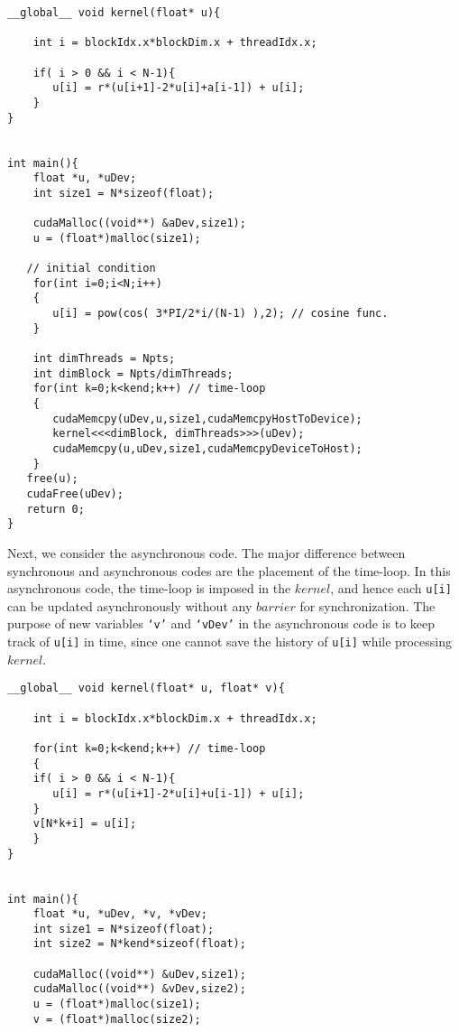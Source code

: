 \documentclass[1p]{elsarticle}
\begin{document}
\begin{itemize}
{\color[rgb]{0.54, 0.2, 0.14}{\item \bf Synchronous Algorithm}}
\begin{lstlisting}
__global__ void kernel(float* u){

    int i = blockIdx.x*blockDim.x + threadIdx.x;
  
	if( i > 0 && i < N-1){
	   u[i] = r*(u[i+1]-2*u[i]+a[i-1]) + u[i];
	}
}


int main(){
    float *u, *uDev;
    int size1 = N*sizeof(float);

    cudaMalloc((void**) &aDev,size1);
    u = (float*)malloc(size1);

   // initial condition
    for(int i=0;i<N;i++)
    {
	   u[i] = pow(cos( 3*PI/2*i/(N-1) ),2); // cosine func.
    }

    int dimThreads = Npts;
    int dimBlock = Npts/dimThreads;
    for(int k=0;k<kend;k++) // time-loop
    {
	   cudaMemcpy(uDev,u,size1,cudaMemcpyHostToDevice);
	   kernel<<<dimBlock, dimThreads>>>(uDev);
	   cudaMemcpy(u,uDev,size1,cudaMemcpyDeviceToHost);
    }
   free(u);
   cudaFree(uDev);
   return 0;
}
\end{lstlisting}

Next, we consider the asynchronous code. The major difference between synchronous and asynchronous codes are the placement of the time-loop. In this asynchronous code, the time-loop is imposed in the $kernel$, and hence each \texttt{u[i]} can be updated asynchronously without any  $barrier$ for synchronization. The purpose of new variables \texttt{`v'} and \texttt{`vDev'} in the asynchronous code is to keep track of \texttt{u[i]} in time, since one cannot save the history of \texttt{u[i]} while processing $kernel$.




{\color[rgb]{0.54, 0.2, 0.14}{\item \bf Asynchronous Algorithm}}
\begin{lstlisting}
__global__ void kernel(float* u, float* v){

    int i = blockIdx.x*blockDim.x + threadIdx.x;
  
    for(int k=0;k<kend;k++) // time-loop
    {
	if( i > 0 && i < N-1){
	   u[i] = r*(u[i+1]-2*u[i]+u[i-1]) + u[i];
	}
	v[N*k+i] = u[i];
    }
}


int main(){
    float *u, *uDev, *v, *vDev;
    int size1 = N*sizeof(float);
    int size2 = N*kend*sizeof(float);

    cudaMalloc((void**) &uDev,size1);
    cudaMalloc((void**) &vDev,size2);
    u = (float*)malloc(size1);
    v = (float*)malloc(size2);


\end{lstlisting}
\end{itemize}
\end{document}
